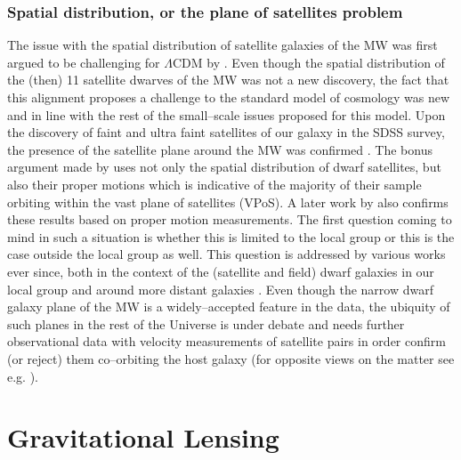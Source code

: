 \documentclass[a4wide,12pt]{book}
\begin{document}
\subsection{Spatial distribution, or the plane of satellites problem}
The issue with the spatial distribution of satellite galaxies of the MW was first argued to be challenging for $\Lambda$CDM by \citet[][]{Kroupa+2005}. Even though the spatial distribution of the (then) 11 satellite dwarves of the MW was not a new discovery, the fact that this alignment proposes a challenge to the standard model of cosmology was new and in line with the rest of the small--scale issues proposed for this model. Upon the discovery of faint and ultra faint satellites of our galaxy in the SDSS survey, the presence of the satellite plane around the MW was confirmed \citep[][]{Metz+2009, Kroupa+2010}. The bonus argument made by \citet[][]{Metz+2009} uses not only the spatial distribution of dwarf satellites, but also their proper motions which is indicative of the majority of their sample orbiting within the vast plane of satellites (VPoS). A later work by \citet[][]{Pawlowski+2013} also confirms these results based on proper motion measurements. The first question coming to mind in such a situation is whether this is limited to the local group or this is the case outside the local group as well. This question is addressed by various works ever since, both in the context of the (satellite and field) dwarf galaxies in our local group \citep[see e.g. ][]{Ibata+2013, Pawlowski+2013, Bellazzini+2013, Pawlowski.McGaugh2014} and around more distant galaxies \citep[see e.g. ][]{Tully+2015, Muller+2015}. Even though the narrow dwarf galaxy plane of the MW is a widely--accepted feature in the data, the ubiquity of such planes in the rest of the Universe is under debate and needs further observational data with velocity measurements of satellite pairs in order confirm (or reject) them co--orbiting the host galaxy (for opposite views on the matter see e.g. \citealt[][]{Phillips+2015, Cautun+2015}).


\chapter{Gravitational Lensing}
\label{sec:Gravitational lensing}
\end{document}

